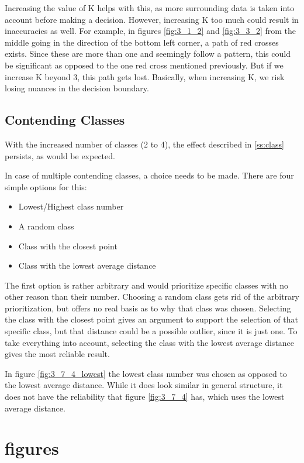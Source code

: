 \documentclass[10pt,a4paper]{article}
\begin{document}
Increasing the value of K helps with this, as more surrounding data is taken into account before making a decision. However, increasing K too much could result in inaccuracies as well. For example, in figures \ref{fig:3_1_2} and \ref{fig:3_3_2} from the middle going in the direction of the bottom left corner, a path of red crosses exists. Since these are more than one and seemingly follow a pattern, this could be significant as opposed to the one red cross mentioned previously. But if we increase K beyond 3, this path gets lost. Basically, when increasing K, we risk losing nuances in the decision boundary.

\subsection{Contending Classes}
With the increased number of classes (2 to 4), the effect described in \ref{ss:class} persists, as would be expected.

In case of multiple contending classes, a choice needs to be made. There are four simple options for this:
\begin{itemize}
\item Lowest/Highest class number
\item A random class
\item Class with the closest point
\item Class with the lowest average distance
\end{itemize}

The first option is rather arbitrary and would prioritize specific classes with no other reason than their number. Choosing a random class gets rid of the arbitrary prioritization, but offers no real basis as to why that class was chosen.
Selecting the class with the closest point gives an argument to support the selection of that specific class, but that distance could be a possible outlier, since it is just one. To take everything into account, selecting the class with the lowest average distance gives the most reliable result.

In figure \ref{fig:3_7_4_lowest} the lowest class number was chosen as opposed to the lowest average distance. While it does look similar in general structure, it does not have the reliability that figure \ref{fig:3_7_4} has, which uses the lowest average distance.

\appendix
\section{figures}
\end{document}
